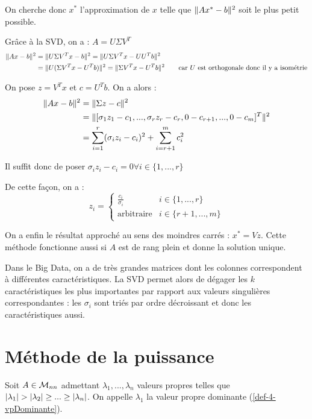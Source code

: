 		On cherche donc $x^*$ l'approximation de $x$ telle que $\lVert Ax^*-b \rVert^2$ soit le plus petit possible.

		Grâce à la SVD, on a : $A=U\Sigma V^T$
		\begin{align*}
			\lVert Ax-b \rVert^2
				&= \lVert U\Sigma V^T x-b \rVert^2 = \lVert U\Sigma V^Tx - UU^Tb \rVert^2		\\
				&= \lVert U(\Sigma V^T x- U^Tb) \rVert^2 = \lVert \Sigma V^T x - U^Tb \rVert^2 \text{\qquad car $U$ est orthogonale donc il y a isométrie}
		\end{align*}

		On pose $z = V^T x$ et $c= U^Tb$.
		On a alors : 
		\begin{align*}
			\lVert Ax-b \rVert^2
				&= \lVert \Sigma z - c \rVert^2	\\
				&= \lVert [\sigma_1 z_1 - c_1, ..., \sigma_r z_r -c_r, 0 - c_{r+1}, ..., 0 - c_m]^T \rVert^2	\\
				&= \sum_{i=1}^r (\sigma_i z_i - c_i)^2 + \sum_{i=r+1}^m c_i^2
		\end{align*}

		Il suffit donc de poser $\sigma_i z_i -c_i= 0 \forall i \in \{1, ..., r\}$

		De cette façon, on a :
		$$
			z_i = \begin{cases}
				\frac{c_i}{\sigma_i}	& i \in \{ 1, ..., r \} \\
				\text{arbitraire}		& i \in \{ r+1, ..., m \}
			\end{cases}
		$$

		On a enfin le résultat approché au sens des moindres carrés : $x^* = Vz$.
		Cette méthode fonctionne aussi si $A$ est de rang plein et donne la solution unique.




		Dans le Big Data, on a de très grandes matrices dont les colonnes correspondent à différentes caractéristiques. La SVD permet alors de dégager les $k$ caractéristiques les plus importantes par rapport aux valeurs singulières correspondantes : les $\sigma_i$ sont triés par ordre décroissant et donc les caractéristiques aussi.


\section{Méthode de la puissance}

	Soit $A \in \mathcal{M}_{nn}$ admettant $\lambda_1, ..., \lambda_n$ valeurs propres telles que $\lvert \lambda_1 \rvert > \lvert \lambda_2 \rvert \geq ... \geq \lvert \lambda_n \rvert$. On appelle $\lambda_1$ la valeur propre dominante (\ref{def-4-vpDominante}).

